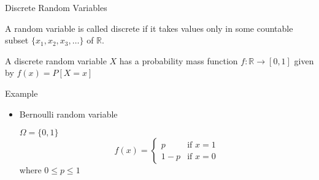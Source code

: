 \documentclass[t]{beamer}
\begin{document}
\begin{frame}{Discrete Random Variables}
  \footnotesize
  \pause
  \begin{definition}[]
    A random variable is called discrete if it takes values only in some countable subset $\{x_1, x_2, x_3,\ldots \}$ of $\mathbb{R}$.
  \end{definition}
  \pause
  \begin{definition}[]
    A discrete random variable $X$ has a probability mass function $f: \mathbb{R} \rightarrow [0,1]$ given by $f(x) = P[X = x]$
  \end{definition}
  \pause
  \begin{block}{Example}
    \begin{itemize}
      \item Bernoulli random variable \pause

      $\Omega = \{0,1\}$ \pause
      \begin{equation*}
        f(x) = \left\{
                      \begin{array}{ll}
                        p & \text{if $x = 1$}\\
                        1-p & \text{if $x = 0$}
                      \end{array}
                   \right.
      \end{equation*}
      where $ 0 \leq p \leq 1$
    \end{itemize}
  \end{block}
  \normalsize
\end{frame}
\end{document}
